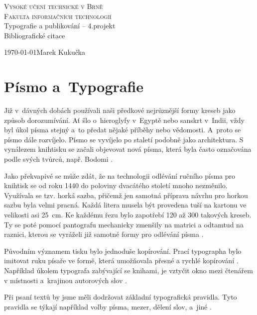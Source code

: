 \documentclass[a4paper,11pt]{article}
\begin{document}
\begin{titlepage}
\begin{center}
\Huge\textsc{Vysoké učení technické v Brně} \\
\huge\textsc{Fakulta informačních technologií} \\
\LARGE{Typografie a publikování -- 4.projekt} \\
\Huge{Bibliografické citace}
\end{center}
\Large\today \hfill Marek Kukučka
\end{titlepage}

\section{Písmo a~Typografie}
Již v~dávných dobách používali naši předkové nejrůznější formy kreseb jako způsob dorozumívání. Ať šlo o~hieroglyfy v~Egyptě nebo sanskrt v~Indii, vždy byl úkol písma stejný a~to předat nějaké příběhy nebo vědomosti. A~proto se písmo dále rozvíjelo\cite{Jiricek:Zivy_font}. Písmo se vyvíjelo po staletí podobně jako architektura. S vynálezem knihtisku se začali objevovat nová písma, která byla často označována podle svých tvůrců, např. Bodomi \cite{Cerny:Znakove_sadi_v_typografickych_systemech}.

Jako překvapivé se může zdát, že na technologii odlévání ručního písma pro knihtisk se od roku 1440 do poloviny dvacátého století mnoho nezměnilo. Využívala se tzv. horká sazba, přičemž jen samotná příprava návrhu pro horkou sazbu byla velmi pracná. Každá litera musela být provedena tuší na kartonu ve velikosti asi 25~cm. Ke každému řezu bylo zapotřebí 120 až 300 takových kreseb. Ty se poté pomocí pantografu mechanicky zmenšily na matrici a odtamtud na raznici, kterou se vyráželi již samotné formy pro odlévání písma \cite{Beran:Typograficky_manual}.

Původním významem tisku bylo jednoduše kopírování. Prací typographa bylo imitovat ruku písaře ve formě, která umožňovala přesné a rychlé kopírování \cite{Bringhurst:The_elements_of_typographic_style}. Například úkolem typografa zabývající se knihami, je vztyčit okno mezi čtenářem v místnosti a~krajinou autorových slov \cite{Warde:The_crystal_goblet}.

Při psaní textů by jsme měli dodržovat základní typografická pravidla. Tyto pravidla se týkají například volby písma, mezer, dělení slov, a~jiné \cite{Kerslager:Typograficka_pravidla}.
\end{document}
